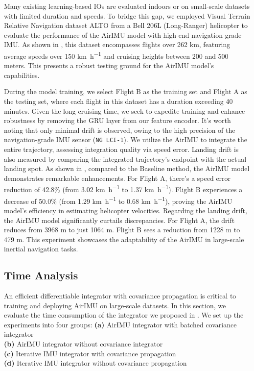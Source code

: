 Many existing learning-based IOs are evaluated indoors or on small-scale datasets with limited duration and speeds. 
To bridge this gap, we employed Visual Terrain Relative Navigation dataset ALTO\cite{cisneros2022alto} from a Bell 206L (Long-Ranger) helicopter to evaluate the performance of the AirIMU model with high-end navigation grade IMU. 
As shown in , this dataset encompasses flights over 262 \si{\km}, featuring average speeds over 150 \si{\km\per\hour} and cruising heights between 200 and 500 meters. This presents a robust testing ground for the AirIMU model's capabilities.

During the model training, we select Flight B as the training set and Flight A as the testing set, where each flight in this dataset has a duration exceeding 40 minutes. 
Given the long cruising time, we seek to expedite training and enhance robustness by removing the GRU layer from our feature encoder. 
It's worth noting that only minimal drift is observed, owing to the high precision of the navigation-grade IMU sensor (\texttt{NG LCI-1}).
We utilize the AirIMU to integrate the entire trajectory, assessing integration quality via speed error. 
Landing drift is also measured by comparing the integrated trajectory's endpoint with the actual landing spot. 
As shown in , compared to the Baseline method, the AirIMU model demonstrates remarkable enhancements. For Flight A, there's a speed error reduction of 42.8\% (from 3.02 \si{\km\per\hour} to 1.37 \si{\km\per\hour}). Flight B experiences a decrease of 50.0\% (from 1.29 \si{\km\per\hour} to 0.68 \si{\km\per\hour}), proving the AirIMU model's efficiency in estimating helicopter velocities.
Regarding the landing drift, the AirIMU model significantly curtails discrepancies. For Flight A, the drift reduces from 3968 \si{\meter} to just 1064 \si{\meter}. Flight B sees a reduction from 1228 \si{\meter} to 479 \si{\meter}. This experiment showcases the adaptability of the AirIMU in large-scale inertial navigation tasks.


\subsection{Time Analysis}\label{Exp: Time}
An efficient differentiable integrator with covariance propagation is critical to training and deploying AirIMU on large-scale datasets. 
In this section, we evaluate the time consumption of the integrator we proposed in . 
We set up the experiments into four groups:
\noindent\textbf{(a)} AirIMU integrator with batched covariance integrator\\
\textbf{(b)} AirIMU integrator without covariance integrator\\
\textbf{(c)} Iterative IMU integrator with covariance propagation\\
\textbf{(d)} Iterative IMU integrator without covariance propagation

